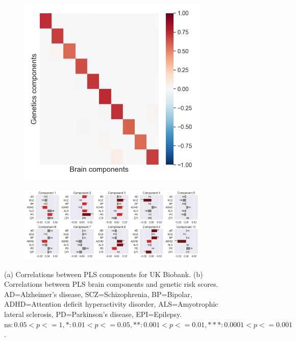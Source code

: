 \begin{figure}
    \centering
    \begin{subfigure}[b]{0.27\textwidth}
        \centering
        \includegraphics[width=\textwidth,trim={0.8cm 0cm 0.3cm 0cm}]{figures/gradient_descent/UKBB/cross_corr.png}
        \caption{}
        \label{fig:UKBB_corr}
    \end{subfigure}
    \begin{subfigure}[b]{0.72\textwidth}
        \centering
        \includegraphics[width=\textwidth,trim={0.5cm 0cm 0.7cm 0cm}]{figures/gradient_descent/UKBB/prs_correlations.png}
        \caption{}
        \label{fig:genetic_risk}
    \end{subfigure}
    \caption{(a) Correlations between PLS components for UK Biobank. (b) Correlations between PLS brain components and genetic risk scores. AD=Alzheimer's disease, SCZ=Schizophrenia, BP=Bipolar, ADHD=Attention deficit hyperactivity disorder, ALS=Amyotrophic lateral sclerosis, PD=Parkinson's disease, EPI=Epilepsy. $\text{ns}: 0.05< p <= 1, \ast: 0.01< p <=0.05, \ast\ast: 0.001< p <= 0.01, \ast\ast\ast: 0.0001< p <= 0.001$.}
\end{figure}

